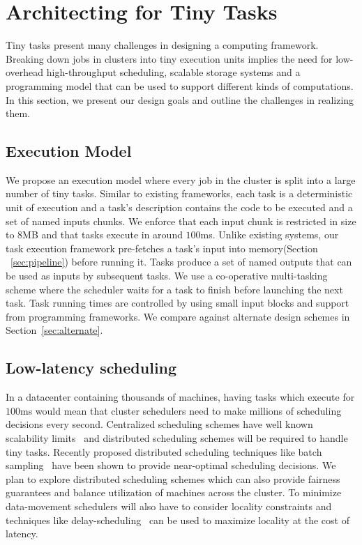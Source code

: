 \section{Architecting for Tiny Tasks}
Tiny tasks present many challenges in designing a computing framework.  Breaking
down jobs in clusters into tiny execution units implies the need for
low-overhead high-throughput scheduling, scalable storage systems and a
programming model that can be used to support different kinds of computations.
In this section, we present our design goals and outline the challenges in
realizing them.

\subsection{Execution Model}
We propose an execution model where every job in the cluster is split into a
large number of tiny tasks. Similar to existing frameworks, each task is a
deterministic unit of execution and a task's description contains the code to be
executed and a set of named inputs chunks. We enforce that each input chunk is
restricted in size to 8MB and that tasks execute in around $100$ms.  Unlike
existing systems, our task execution framework pre-fetches a task's input into
memory(Section ~\ref{sec:pipeline}) before running it. Tasks produce a set of named
outputs that can be used as inputs by subsequent tasks. We use a co-operative
multi-tasking scheme where the scheduler waits for a task to finish before launching
the next task.  Task running times are controlled by using small input blocks
and support from programming frameworks. We compare against alternate design
schemes in Section~\ref{sec:alternate}.

\subsection{Low-latency scheduling}
In a datacenter containing thousands of machines, having tasks which execute for
$100$ms would mean that cluster schedulers need to make millions of scheduling
decisions every second. Centralized scheduling schemes have well known
scalability limits~\cite{john-wilkes-berkeley} and distributed scheduling
schemes will be required to handle tiny tasks. Recently proposed distributed
scheduling techniques like batch sampling~\cite{sparrow} have been shown to 
provide near-optimal scheduling decisions. We plan to explore distributed 
scheduling schemes which can also provide fairness guarantees and balance
utilization of machines across the cluster. To minimize data-movement
schedulers will also have to consider locality constraints
and techniques like delay-scheduling~\cite{delay} can be used to maximize locality at the
cost of latency. 

